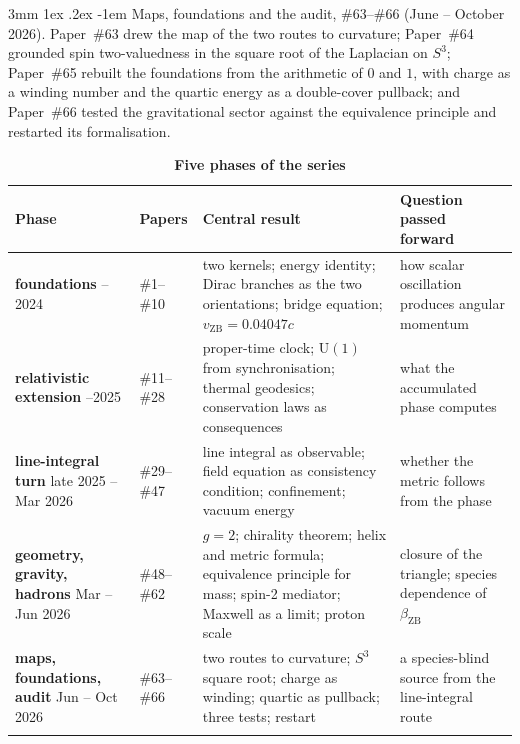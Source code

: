 \documentclass[%
 reprint, amsmath,amssymb, aps, prb, ]{revtex4-2}
\makeatletter
\numberwithin{equation}{section}
\renewcommand\paragraph{%
  \@startsection{paragraph}{4}{\z@}%
    {3mm \@plus 1ex \@minus .2ex}%
    {-1em}%
    {\normalfont\normalsize\itshape}}
\newcommand{\vZB}{v_{\text{ZB}}}
\newcommand{\betaZB}{\beta_{\text{ZB}}}
\makeatother
\begin{document}
\paragraph{Maps, foundations and the audit, \#63--\#66 (June -- October 2026).} Paper~\#63 drew the map of the two routes to curvature; Paper~\#64 grounded spin two-valuedness in the square root of the Laplacian on $S^{3}$; Paper~\#65 rebuilt the foundations from the arithmetic of $0$ and $1$, with charge as a winding number and the quartic energy as a double-cover pullback; and Paper~\#66 tested the gravitational sector against the equivalence principle and restarted its formalisation.

\begin{table}[t!]
\centering
\caption{\textbf{Five phases of the series}}
\label{tab:waves}
\renewcommand{\arraystretch}{1.4}
\setlength{\tabcolsep}{7pt}
\begin{tabular}{>{\raggedright\arraybackslash}p{3.0cm}>{\raggedright\arraybackslash}p{1.8cm}>{\raggedright\arraybackslash}p{5.8cm}>{\raggedright\arraybackslash}p{5.2cm}}
\toprule
\textbf{Phase} & \textbf{Papers} & \textbf{Central result} & \textbf{Question passed forward} \\
\midrule
\textcolor{wone}{\textbf{foundations}} \newline 2018--2024 & \#1--\#10 & two kernels; energy identity; Dirac branches as the two orientations; bridge equation; $\vZB = 0.04047c$ & how scalar oscillation produces angular momentum \\
\addlinespace[0.2cm]
\textcolor{wtwo!80!black}{\textbf{relativistic extension}} \newline 2024--2025 & \#11--\#28 & proper-time clock; $\mathrm{U}(1)$ from synchronisation; thermal geodesics; conservation laws as consequences & what the accumulated phase computes \\
\addlinespace[0.2cm]
\textcolor{wthree}{\textbf{line-integral turn}} \newline late 2025 -- Mar 2026 & \#29--\#47 & line integral as observable; field equation as consistency condition; confinement; vacuum energy & whether the metric follows from the phase \\
\addlinespace[0.2cm]
\textcolor{wfour}{\textbf{geometry, gravity, hadrons}} \newline Mar -- Jun 2026 & \#48--\#62 & $g=2$; chirality theorem; helix and metric formula; equivalence principle for mass; spin-2 mediator; Maxwell as a limit; proton scale & closure of the triangle; species dependence of $\betaZB$ \\
\addlinespace[0.2cm]
\textcolor{wfive}{\textbf{maps, foundations, audit}} \newline Jun -- Oct 2026 & \#63--\#66 & two routes to curvature; $S^{3}$ square root; charge as winding; quartic as pullback; three tests; restart & a species-blind source from the line-integral route \\
\addlinespace[0.1cm]
\bottomrule
\end{tabular}
\end{table}
\end{document}
